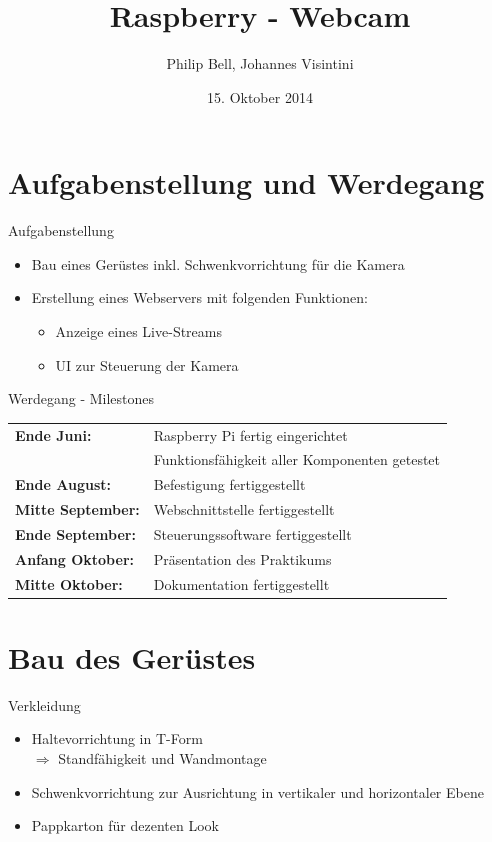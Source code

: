 \documentclass{beamer}
\title{Raspberry - Webcam}
\author{Philip Bell, Johannes Visintini}
\date{15. Oktober 2014}
\begin{document}
\begin{frame}
\titlepage
\end{frame}

\begin{frame} %
\tableofcontents
\end{frame}

\section{Aufgabenstellung und Werdegang}
\begin{frame}{Aufgabenstellung}
\begin{itemize}
	\item Bau eines Gerüstes inkl. Schwenkvorrichtung für die Kamera
	\item Erstellung eines Webservers mit folgenden Funktionen:
	\begin{itemize}
		\item Anzeige eines Live-Streams
		\item UI zur Steuerung der Kamera
	\end{itemize}
\end{itemize}
\end{frame}

\begin{frame}{Werdegang - Milestones}
\begin{tabular}{l l}
	\textbf{Ende Juni:}			& Raspberry Pi fertig eingerichtet\\
								& Funktionsfähigkeit aller Komponenten getestet\\
	\textbf{Ende August:}			& Befestigung fertiggestellt\\
	\textbf{Mitte September:}		& Webschnittstelle fertiggestellt\\
	\textbf{Ende September:}		& Steuerungssoftware fertiggestellt\\
	\textbf{Anfang Oktober:}	& Präsentation des Praktikums\\
	\textbf{Mitte Oktober:}		& Dokumentation fertiggestellt
\end{tabular}
\end{frame}

\section{Bau des Gerüstes}%
\begin{frame}{Verkleidung}
\begin{itemize}
	\item<1-> Haltevorrichtung in T-Form\\ $\Rightarrow$ Standfähigkeit und Wandmontage
	\item<2-> Schwenkvorrichtung zur Ausrichtung in vertikaler und horizontaler Ebene
	\item<3-> Pappkarton für dezenten Look
\end{itemize}
\end{frame}
\end{document}
